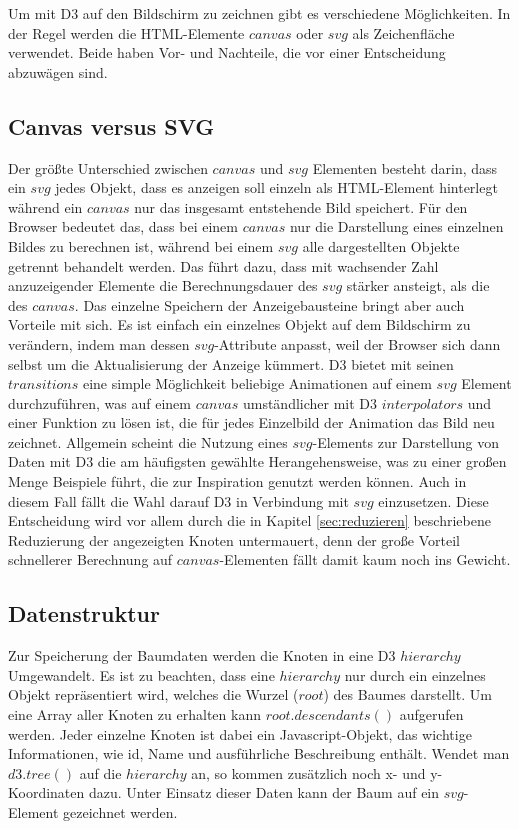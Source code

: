 Um mit D3 auf den Bildschirm zu zeichnen gibt es verschiedene Möglichkeiten. In der Regel werden die HTML-Elemente $canvas$ oder $svg$ als Zeichenfläche verwendet. Beide haben Vor- und Nachteile, die vor einer Entscheidung abzuwägen sind.

\subsection{Canvas versus SVG}\label{sec:cvs}
Der größte Unterschied zwischen $canvas$ und $svg$ Elementen besteht darin, dass ein $svg$ jedes Objekt, dass es anzeigen soll einzeln als HTML-Element hinterlegt während ein $canvas$ nur das insgesamt entstehende Bild speichert. Für den Browser bedeutet das, dass bei einem $canvas$ nur die Darstellung eines  einzelnen Bildes zu berechnen ist, während bei einem $svg$ alle dargestellten Objekte getrennt behandelt werden. Das führt dazu, dass mit wachsender Zahl anzuzeigender Elemente die Berechnungsdauer des $svg$ stärker ansteigt, als die des $canvas$. Das einzelne Speichern der Anzeigebausteine bringt aber auch Vorteile mit sich. Es ist einfach ein einzelnes Objekt auf dem Bildschirm zu verändern, indem man dessen $svg$-Attribute anpasst, weil der Browser sich dann selbst um die Aktualisierung der Anzeige kümmert. D3 bietet mit seinen $transitions$ eine simple Möglichkeit beliebige Animationen auf einem $svg$ Element durchzuführen, was auf einem $canvas$ umständlicher mit D3 $interpolators$ und einer Funktion zu lösen ist, die für jedes Einzelbild der Animation das Bild neu zeichnet. Allgemein scheint die Nutzung eines $svg$-Elements zur Darstellung von Daten mit D3 die am häufigsten gewählte Herangehensweise, was zu einer großen Menge Beispiele führt, die zur Inspiration genutzt werden können. Auch in diesem Fall fällt die Wahl darauf D3 in Verbindung mit $svg$ einzusetzen. Diese Entscheidung wird vor allem durch die in Kapitel \ref{sec:reduzieren} beschriebene Reduzierung der angezeigten Knoten untermauert, denn der große Vorteil schnellerer Berechnung auf $canvas$-Elementen fällt damit kaum noch ins Gewicht.

\subsection{Datenstruktur}
Zur Speicherung der Baumdaten werden die Knoten in eine D3 $hierarchy$ Umgewandelt. Es ist zu beachten, dass eine $hierarchy$ nur durch ein einzelnes Objekt repräsentiert wird, welches die Wurzel ($root$) des Baumes darstellt. Um eine Array aller Knoten zu erhalten kann $root.descendants()$ aufgerufen werden. Jeder einzelne Knoten ist dabei ein Javascript-Objekt, das wichtige Informationen, wie id, Name und ausführliche Beschreibung enthält. Wendet man $d3.tree()$ auf die $hierarchy$ an, so kommen zusätzlich noch x- und y-Koordinaten dazu. Unter Einsatz dieser Daten kann der Baum auf ein $svg$-Element gezeichnet werden.

